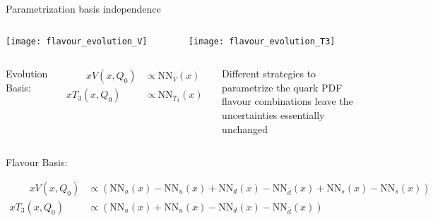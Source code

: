\begin{frame}{Parametrization basis independence}
    \begin{columns}
        \begin{column}[T]{0.48\textwidth}
        \vspace*{0pt}%
	        \begin{center}
	            \texttt{[image: flavour\_evolution\_V]} \\
	        \end{center}
        \end{column}
        \begin{column}[t]{0.48\textwidth}
        \vspace{0pt}%
	        \begin{center}
	            \texttt{[image: flavour\_evolution\_T3]} \\
	        \end{center}
        \end{column}
    \end{columns}
    \begin{columns}
		    Evolution Basis:
		    {\footnotesize
		    \begin{fleqn}
		    \begin{align*}
		       \qquad x V\left(x, Q_{0}\right) &\propto \mathrm{NN}_{V}(x)\\
		        x T_{3}\left(x, Q_{0}\right) &\propto \mathrm{NN}_{T_{3}}(x)
		    \end{align*}
		    \end{fleqn}
		    }
            \begin{block}{}
                Different strategies to parametrize the quark PDF flavour combinations leave the uncertainties essentially unchanged
            \end{block}
    \end{columns}
    \vspace*{-0.5em}
    Flavour Basis:
    {\footnotesize
    \begin{fleqn}
    \begin{align*}
        \qquad x V\left(x, Q_{0}\right) &\propto\left(\mathrm{NN}_{u}(x)-\mathrm{NN}_{\bar{u}}(x)+\mathrm{NN}_{d}(x)-\mathrm{NN}_{\bar{d}}(x)+\mathrm{NN}_{s}(x)-\mathrm{NN}_{\bar{s}}(x)\right) \\
        x T_{3}\left(x, Q_{0}\right) &\propto\left(\mathrm{NN}_{u}(x)+\mathrm{NN}_{\bar{u}}(x)-\mathrm{NN}_{d}(x)-\mathrm{NN}_{\bar{d}}(x)\right)
    \end{align*}
    \end{fleqn}
    }
\end{frame}

